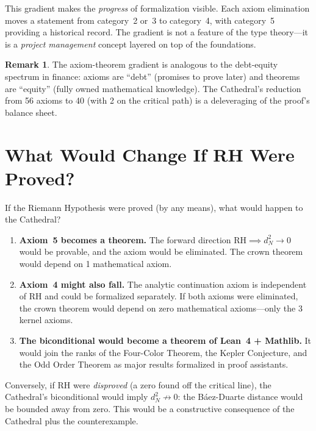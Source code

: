 \documentclass[11pt,a4paper]{article}
\theoremstyle{plain}
\theoremstyle{definition}
\newtheorem{remark}[theorem]{Remark}
\newcommand{\RH}{\ensuremath{\mathrm{RH}}}
\begin{document}
This gradient makes the \emph{progress} of formalization visible.
Each axiom elimination moves a statement from category~2 or~3 to
category~4, with category~5 providing a historical record. The
gradient is not a feature of the type theory---it is a \emph{project
management} concept layered on top of the foundations.

\begin{remark}
The axiom-theorem gradient is analogous to the debt-equity spectrum
in finance: axioms are ``debt'' (promises to prove later) and theorems
are ``equity'' (fully owned mathematical knowledge). The Cathedral's
reduction from 56 axioms to 40 (with 2 on the critical path) is a
deleveraging of the proof's balance sheet.
\end{remark}

\section{What Would Change If RH Were Proved?}
\label{sec:if}

If the Riemann Hypothesis were proved (by any means), what would
happen to the Cathedral?

\begin{enumerate}
  \item \textbf{Axiom~5 becomes a theorem.} The forward direction
    $\RH \implies d_N^2 \to 0$ would be provable, and the axiom
    would be eliminated. The crown theorem would depend on 1
    mathematical axiom.
  \item \textbf{Axiom~4 might also fall.} The analytic continuation
    axiom is independent of \RH{} and could be formalized separately.
    If both axioms were eliminated, the crown theorem would depend
    on zero mathematical axioms---only the 3 kernel axioms.
  \item \textbf{The biconditional would become a theorem of
    Lean~4 + Mathlib.} It would join the ranks of the Four-Color
    Theorem, the Kepler Conjecture, and the Odd Order Theorem as
    major results formalized in proof assistants.
\end{enumerate}

Conversely, if \RH{} were \emph{disproved} (a zero found off the
critical line), the Cathedral's biconditional would imply
$d_N^2 \not\to 0$: the B\'aez-Duarte distance would be bounded
away from zero. This would be a constructive consequence of the
Cathedral plus the counterexample.
\end{document}
